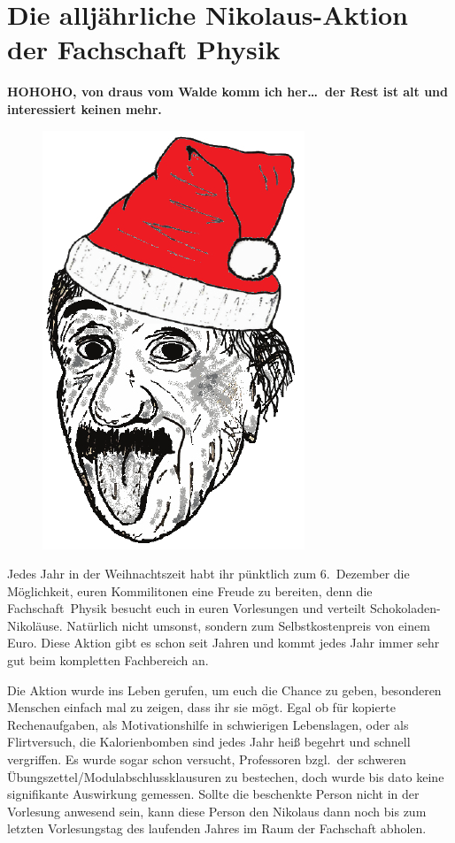 \section{Die alljährliche Nikolaus-Aktion der Fachschaft Physik}
\begin{multicols}{2}
\textbf{HOHOHO, von draus vom Walde komm ich her\dots\ der Rest ist alt und interessiert keinen mehr.}

{%
\setlength{\columnsep}{0.2cm}
\begin{figure}
\centering
\includegraphics[width=0.55\columnwidth]{res/nikolaus_einstein.png}
\end{figure}
Jedes Jahr in der Weihnachtszeit habt ihr pünktlich zum 6.\ Dezember die Möglichkeit, euren Kommilitonen eine Freude zu bereiten, denn die Fachschaft~Physik besucht euch in euren Vorlesungen und verteilt Schokoladen-Nikoläuse. Natürlich nicht umsonst, sondern zum Selbstkostenpreis von einem Euro. Diese Aktion gibt es schon seit Jahren und kommt jedes Jahr immer sehr gut beim kompletten Fachbereich an.

Die Aktion wurde ins Leben gerufen, um euch die Chance zu geben, besonderen Menschen einfach mal zu zeigen, dass ihr sie mögt. Egal ob für kopierte Rechenaufgaben, als Motivationshilfe in schwierigen Lebenslagen, oder als Flirtversuch, die Kalorienbomben sind jedes Jahr heiß begehrt und schnell vergriffen. Es wurde sogar schon versucht, Professoren bzgl.\ der schweren Übungszettel/Modulabschlussklausuren zu bestechen, doch wurde bis dato keine signifikante Auswirkung gemessen. Sollte die beschenkte Person nicht in der Vorlesung anwesend sein, kann diese Person den Nikolaus dann noch bis zum letzten Vorlesungstag des laufenden Jahres im Raum der Fachschaft abholen.}


\end{multicols}
